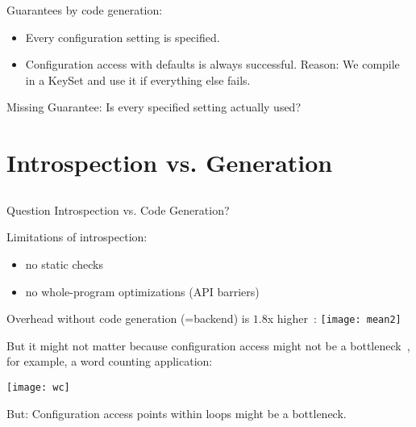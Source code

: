 \begin{frame}
	Guarantees by code generation:
	\begin{itemize}
	\item Every configuration setting is specified.
	\item Configuration access with defaults is always successful.
	Reason: We compile in a KeySet and use it if everything else fails.
	\end{itemize}
	\vspace{3em}
	Missing Guarantee: Is every specified setting actually used?
\end{frame}



\section{Introspection vs. Generation}

\subsection{}

\begin{frame}
	\begin{alertblock}{Question}
	Introspection vs. Code Generation?
	\end{alertblock}
\end{frame}

\begin{frame}
	Limitations of introspection:
	\begin{itemize}
	\item no static checks
	\item no whole-program optimizations (API barriers)
	\end{itemize}
\end{frame}

\begin{frame}
	Overhead without code generation (=backend) is $1.8$x higher~\cite{raab2015kps}:
	\texttt{[image: mean2]}
\end{frame}

\begin{frame}
	But it might not matter because configuration access might not be a bottleneck~\cite{raab2015kps},
	for example, a word counting application:

	\texttt{[image: wc]}

	But: \pause
	Configuration access points within loops might be a bottleneck.
\end{frame}

